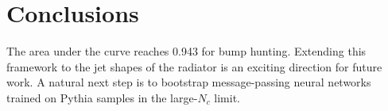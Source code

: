 \section{Conclusions}\label{sec:conclusions}

The area under the curve reaches 0.943 for bump hunting. Extending this
framework to the jet shapes of the radiator is an exciting direction for
future work. A natural next step is to bootstrap message-passing neural
networks trained on Pythia samples in the large-$N_c$ limit.

